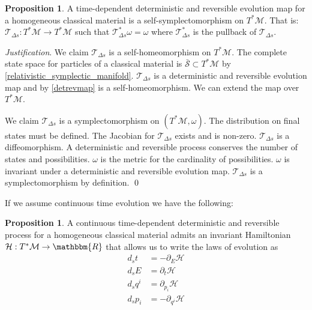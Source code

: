 \documentclass[aps,pra,10pt,twocolumn,floatfix,nofootinbib]{revtex4-1}
\numberwithin{equation}{section}
\theoremstyle{definition}
\newtheorem{prop}[equation]{Proposition}
\newenvironment{justification}{\emph{Justification}.}{\qed}
\begin{document}
\begin{prop}\label{relativistic_canonical_transformation}
	A time-dependent deterministic and reversible evolution map for a homogeneous classical material is a self-symplectomorphism on $T^*\mathcal{M}$. That is: $\mathcal{T}_{\Delta s}: T^*\mathcal{M} \rightarrow T^*\mathcal{M}$ such that $\mathcal{T}_{\Delta s}^*\omega = \omega$ where $\mathcal{T}_{\Delta s}^*$ is the pullback of $\mathcal{T}_{\Delta s}$.
\end{prop}

\begin{justification}
	We claim $\mathcal{T}_{\Delta s}$ is a self-homeomorphism on $T^*\mathcal{M}$. The complete state space for particles of a classical material is $\bar{\mathcal{S}} \subset T^*\mathcal{M}$ by \ref{relativistic_symplectic_manifold}. $\mathcal{T}_{\Delta s}$ is a deterministic and reversible evolution map and by \ref{detrevmap} is a self-homeomorphism. We can extend the map over $T^*\mathcal{M}$.
	
	We claim $\mathcal{T}_{\Delta s}$ is a symplectomorphism on $(T^*\mathcal{M}, \omega)$. The distribution on final states must be defined. The Jacobian for $\mathcal{T}_{\Delta s}$ exists and is non-zero. $\mathcal{T}_{\Delta s}$ is a diffeomorphism. A deterministic and reversible process conserves the number of states and possibilities. $\omega$ is the metric for the cardinality of possibilities. $\omega$ is invariant under a deterministic and reversible evolution map. $\mathcal{T}_{\Delta s}$ is a symplectomorphism by definition.
\end{justification}

If we assume continuous time evolution we have the following:

\begin{prop}\label{relativistic_hamiltons_equations}
	A continuous time-dependent deterministic and reversible process for a homogeneous classical material admits an invariant Hamiltonian $\mathcal{H}: T^*\mathcal{M} \rightarrow \mathbbm{R}$ that allows us to write the laws of evolution as
	\begin{align*}
	d_{s}t &= - \partial_{E} \mathcal{H} \\
	d_{s}E &= \partial_{t} \mathcal{H} \\
	d_{s}q^i &= \partial_{p_i} \mathcal{H} \\
	d_{s}p_i &= - \partial_{q^i} \mathcal{H}
	\end{align*}
\end{prop}
\end{document}

